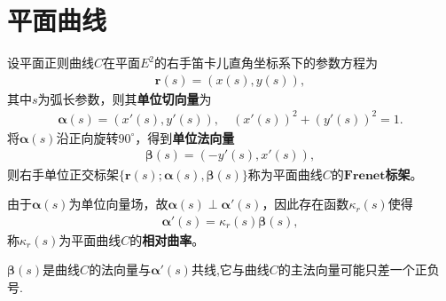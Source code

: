\documentclass[../../main.tex]{subfiles}%
\begin{document}
\section{平面曲线}

\begin{definition}
设平面正则曲线$C$在平面$E^2$的右手笛卡儿直角坐标系下的参数方程为
\begin{align*}
\bm{r}(s)=(x(s),y(s)),
\end{align*}
其中$s$为弧长参数，则其\textbf{单位切向量}为
\begin{align*}
\bm{\alpha}(s)=(x'(s),y'(s)),\quad(x'(s))^2+(y'(s))^2=1.
\end{align*}
将$\bm{\alpha}(s)$沿正向旋转$90^\circ$，得到\textbf{单位法向量}
\begin{align*}
\bm{\beta}(s)=(-y'(s),x'(s)),
\end{align*}
则右手单位正交标架$\{\bm{r}(s);\bm{\alpha}(s),\bm{\beta}(s)\}$称为平面曲线$C$的$\mathbf{Frenet}$\textbf{标架}。

由于$\bm{\alpha}(s)$为单位向量场，故$\bm{\alpha}(s)\perp\bm{\alpha}'(s)$，因此存在函数$\kappa_r(s)$使得
\begin{align*}
\bm{\alpha}'(s)=\kappa_r(s)\bm{\beta}(s),
\end{align*}
称$\kappa_r(s)$为平面曲线$C$的\textbf{相对曲率}。
\end{definition}
\begin{remark}
$\bm{\beta}(s)$是曲线$C$的法向量与$\bm{\alpha}'(s)$共线,它与曲线$C$的主法向量可能只差一个正负号.
\end{remark}
\end{document}
